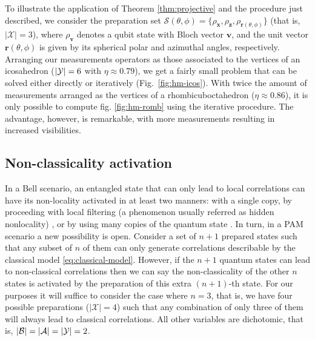 \documentclass[a4paper,preprintnumbers,floatfix,superscriptaddress,pra,twocolumn,showpacs,notitlepage,longbibliography]{revtex4-2}
\begin{document}
    
    To illustrate the application of Theorem \ref{thm:projective} and the procedure just described, we consider the preparation set $\mathcal{S}(\theta, \phi) = \{ \rho_{\bm{x}}, \rho_{\bm{z}}, \rho_{\bm{r}(\theta, \phi)} \}$ (that is, $\vert \mathcal{X}\vert=3$), where $\rho_{\bm{v}}$ denotes a qubit state with Bloch vector $\bm{v}$, and the unit vector $\bm{r}(\theta, \phi)$ is given by its spherical polar and azimuthal angles, respectively. Arranging our measurements operators as those associated to the vertices of an icosahedron ($\abs{\mathcal{Y}} = 6$ with $\eta \approx 0.79$), we get a fairly small problem that can be solved either directly or iteratively (Fig.~\ref{fig:hm-icos}). With twice the amount of measurements arranged as the vertices of a rhombicuboctahedron ($\eta \approx 0.86$), it is only possible to compute fig. \ref{fig:hm-romb} using the iterative procedure. The advantage, however, is remarkable, with more measurements resulting in increased visibilities.
    
    
    
    
    \subsection{Non-classicality activation}
    
        In a Bell scenario, an entangled state that can only lead to local correlations can have its non-locality activated in at least two manners: with a single copy, by proceeding with local filtering (a phenomenon usually referred as hidden nonlocality) \cite{popescu-filtering-1995, hirsch-hidden-2013,gallego2014nonlocality}, or by using many copies of the quantum state \cite{navascues-activation-2011, palazuelos-superactivation-2012,cavalcanti2011quantum}. In turn, in a PAM scenario a new possibility is open. Consider a set of $n+1$ prepared states such that any subset of  $n$ of them can only generate correlations describable by the classical model \eqref{eq:classical-model}. However, if the $n+1$ quantum states can lead to non-classical correlations then we can say the non-classicality of the other $n$ states is activated by the preparation of this extra $(n+1)$-th state. For our purposes it will suffice to consider the case where $n=3$, that is, we have four possible preparations ($\vert \mathcal{X} \vert=4$) such that any combination of only three of them will always lead to classical correlations. All other variables are dichotomic, that is, $\abs{\mathcal{B}} = \abs{\mathcal{A}} = \abs{\mathcal{Y}} = 2$.
    
\end{document}
